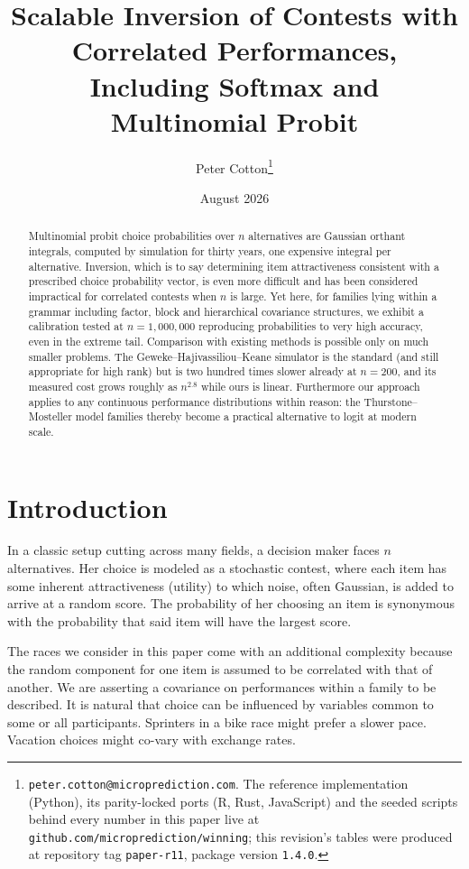 \documentclass[11pt]{article}
\title{Scalable Inversion of Contests with Correlated Performances,\\
Including Softmax and Multinomial Probit}
\author{Peter Cotton\thanks{\texttt{peter.cotton@microprediction.com}. The reference
implementation (Python), its parity-locked ports (R, Rust, JavaScript) and the seeded
scripts behind every number in this paper live at
\texttt{github.com/microprediction/winning}; this revision's tables were
produced at repository tag \texttt{paper-r11}, package version
\texttt{1.4.0}.}}
\date{August 2026}
\begin{document}
\maketitle

\begin{abstract}
Multinomial probit choice probabilities over $n$ alternatives are
Gaussian orthant integrals, computed by simulation for thirty years, one
expensive integral per alternative. Inversion, which is to say determining item
attractiveness consistent with a prescribed choice probability vector, is even more difficult and has been
considered impractical for correlated contests when $n$ is large. Yet here, for families lying within a grammar including factor, block and hierarchical covariance structures, we exhibit a calibration tested at $n=1{,}000{,}000$ reproducing probabilities to very high accuracy, even in the extreme tail. Comparison with existing methods is possible only on much smaller problems. The Geweke--Hajivassiliou--Keane simulator is the standard (and still appropriate for high rank) but is two hundred times slower
already at $n=200$, and its measured cost grows roughly as $n^{2.8}$ while
ours is linear. Furthermore our approach applies to any continuous performance distributions within reason: the Thurstone--Mosteller model families
thereby become a practical alternative to logit at modern scale.
\end{abstract}

\section{Introduction}\label{sec:intro}

In a classic setup cutting across many fields, a decision maker faces $n$ alternatives. Her choice is modeled as a stochastic contest, where each item has some inherent attractiveness (utility) to which noise, often Gaussian, is added to arrive at a random score. The probability of her choosing an item is synonymous with the probability that said item will have the largest score.

The races we consider in this paper come with an additional complexity because the random component for one item is assumed to be correlated with that of another. We are asserting a covariance on performances within a family to be described. It is natural that choice can be influenced by variables common to some or all participants. Sprinters in a bike race might prefer a slower pace. Vacation choices might co-vary with exchange rates.
\end{document}
